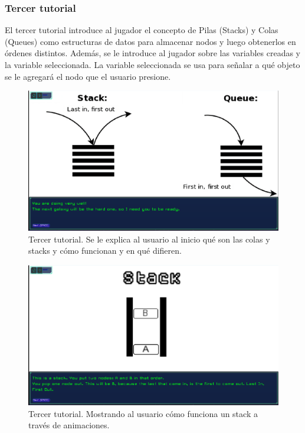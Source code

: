 \subsubsection{Tercer tutorial}

El tercer tutorial introduce al jugador el concepto de Pilas (Stacks) y Colas (Queues) como estructuras de datos para almacenar nodos y luego obtenerlos en órdenes distintos. Además, se le introduce al jugador sobre las variables creadas y la variable seleccionada. La variable seleccionada se usa para señalar a qué objeto se le agregará el nodo que el usuario presione.

\begin{figure}[h]
	\centering
	\includegraphics[scale=0.3]{imagenes/ThirdTutorialFirstDialogue.png}
	\caption{Tercer tutorial. Se le explica al usuario al inicio qué son las colas y stacks y cómo funcionan y en qué difieren.}
	\label{ThirdTutorialFirstDialogue}
\end{figure}


\begin{figure}[h]
	\centering
	\includegraphics[scale=0.3]{imagenes/ThirdTutorialStackExplanation.png}
	\caption{Tercer tutorial. Mostrando al usuario cómo funciona un stack a través de animaciones.}
	\label{ThirdTutorialStackExplanation}
\end{figure}


